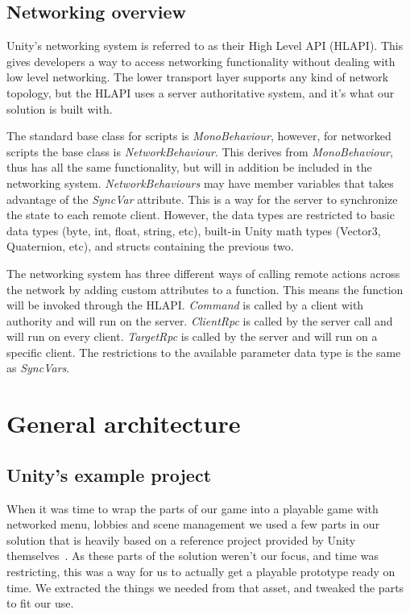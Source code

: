 \subsection{Networking overview}
Unity's networking system is referred to as their High Level API (HLAPI). This gives developers a way to access networking functionality without dealing with low level networking. The lower transport layer supports any kind of network topology, but the HLAPI uses a server authoritative system, and it's what our solution is built with.

The standard base class for scripts is \emph{MonoBehaviour}, however, for networked scripts the base class is \emph{NetworkBehaviour}. This derives from \emph{MonoBehaviour}, thus has all the same functionality, but will in addition be included in the networking system. \emph{NetworkBehaviours} may have member variables that takes advantage of the \emph{SyncVar} attribute. This is a way for the server to synchronize the state to each remote client. However, the data types are restricted to basic data types (byte, int, float, string, etc), built-in Unity math types (Vector3, Quaternion, etc), and structs containing the previous two.

The networking system has three different ways of calling remote actions across the network by adding custom attributes to a function. This means the function will be invoked through the HLAPI. \emph{Command} is called by a client with authority and will run on the server. \emph{ClientRpc} is called by the server call and will run on every client. \emph{TargetRpc} is called by the server and will run on a specific client. The restrictions to the available parameter data type is the same as \emph{SyncVars}.~\cite{unityUNETManual}

\section{General architecture}

\subsection{Unity's example project}
When it was time to wrap the parts of our game into a playable game with networked menu, lobbies and scene management we used a few parts in our solution that is heavily based on a reference project provided by Unity themselves~\cite{unityTanksProject}. As these parts of the solution weren't our focus, and time was restricting, this was a way for us to actually get a playable prototype ready on time. We extracted the things we needed from that asset, and tweaked the parts to fit our use. 

